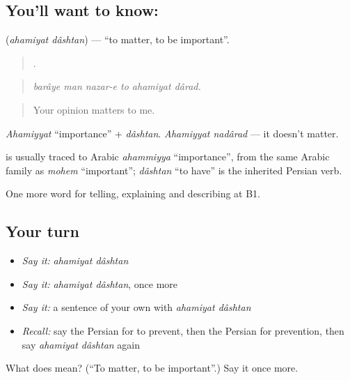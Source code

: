 \subsection*{You'll want to know:  }
\textbf{ } (\emph{ahamiyat dâshtan}) — \textquotedblleft{}to matter, to be important\textquotedblright{}.

\begin{quote}
     .
\end{quote}

\begin{quote}
\emph{barâye man nazar-e to ahamiyat dârad.}
\end{quote}

\begin{quote}
Your opinion matters to me.
\end{quote}

\emph{Ahamiyyat} \textquotedblleft{}importance\textquotedblright{} + \emph{dâshtan}. \emph{Ahamiyyat nadârad} — it doesn't matter.

\begin{cousinweb}
\textbf{} is usually traced to Arabic \emph{ahammiyya} \textquotedblleft{}importance\textquotedblright{}, from the same Arabic family as \emph{mohem} \textquotedblleft{}important\textquotedblright{}; \emph{dâshtan} \textquotedblleft{}to have\textquotedblright{} is the inherited Persian verb.
\end{cousinweb}

\begin{grammarlens}[title={What you've built}]
One more word for telling, explaining and describing at B1.
\end{grammarlens}

\subsection*{Your turn}
\begin{itemize}
\raggedright
  \item \emph{Say it:} \emph{ahamiyat dâshtan}
  \item \emph{Say it:} \emph{ahamiyat dâshtan}, once more
  \item \emph{Say it:} a sentence of your own with \emph{ahamiyat dâshtan}
  \item \emph{Recall:} say the Persian for to prevent, then the Persian for prevention, then say \emph{ahamiyat dâshtan} again
\end{itemize}

\begin{tcolorbox}[breakable,colback=teal!4,colframe=teal!35!black,title={Before you move on}]
What does   mean? (\textquotedblleft{}To matter, to be important\textquotedblright{}.) Say it once more.
\end{tcolorbox}
